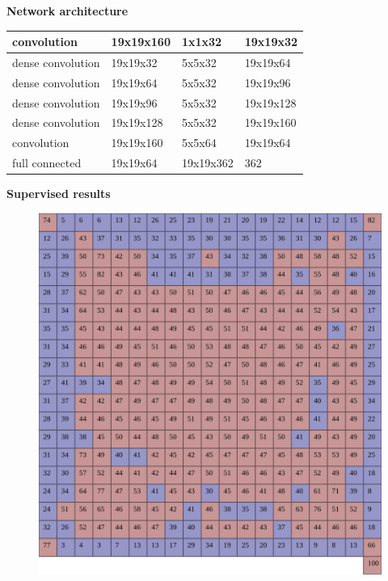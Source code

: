 \documentclass[xcolor=dvipsnames]{beamer}
\begin{document}
\begin{frame}{\bf Network architecture}
{\begin{table}[]
\begin{tabular}{|l|l|l|l|}
\cellcolor[HTML]{34CDF9}convolution       & 19x19x160           & 1x1x32               & 19x19x32             \\ \hline
\cellcolor[HTML]{FD6864}dense convolution & 19x19x32            & 5x5x32               & 19x19x64             \\ \hline
\cellcolor[HTML]{FD6864}dense convolution & 19x19x64            & 5x5x32               & 19x19x96             \\ \hline
\cellcolor[HTML]{FD6864}dense convolution & 19x19x96            & 5x5x32               & 19x19x128            \\ \hline
\cellcolor[HTML]{FD6864}dense convolution & 19x19x128           & 5x5x32               & 19x19x160            \\ \hline
\cellcolor[HTML]{34CDF9}convolution       & 19x19x160           & 5x5x64               & 19x19x64             \\ \hline
\cellcolor[HTML]{67FD9A}full connected    & 19x19x64            & 19x19x362            & 362                  \\ \hline
\end{tabular}
\end{table}

}

\end{frame}


\begin{frame}{\bf Supervised results}

\begin{figure}[!htb]
  \centering
  \includegraphics[scale=0.12]{../../pictures/moves_success_rate_testing_top5.png}
\end{figure}


\end{frame}
\end{document}
